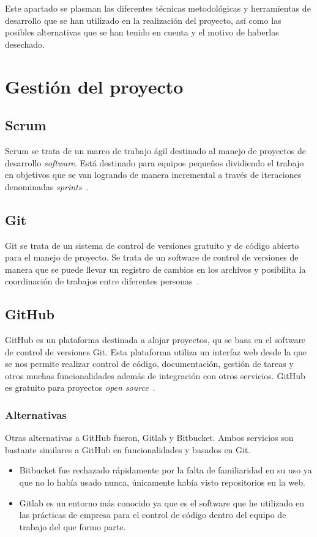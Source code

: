 
Este apartado se plasman las diferentes técnicas metodológicas y herramientas de desarrollo que se han utilizado en la realización del proyecto, así como las posibles alternativas que se han tenido en cuenta y el motivo de haberlas desechado.

\section{Gestión del proyecto}\label{GesProyecto}
\subsection{Scrum}\label{Scrum}
Scrum se trata de un marco de trabajo ágil destinado al manejo de proyectos de desarrollo \emph{software}. Está destinado para equipos pequeños dividiendo el trabajo en objetivos que se van logrando de manera incremental a través de iteraciones denominadas \emph{sprints}~\cite{wiki:scrm}.

\subsection{Git}\label{Git}
Git se trata de un sistema de control de versiones gratuito y de código abierto para el manejo de proyecto. Se trata de un software de control de versiones de manera que se puede llevar un registro de cambios en los archivos y posibilita la coordinación de trabajos entre diferentes personas~\cite{git_1,git_2}.

\subsection{GitHub}\label{GitHub}
GitHub es un plataforma destinada a alojar proyectos, qu se basa en el software de control de versiones Git. Esta plataforma utiliza un interfaz web desde la que se nos permite realizar control de código, documentación, gestión de tareas y otros muchas funcionalidades además de integración con otros servicios. GitHub es gratuito para proyectos \emph{open source}~\cite{wiki:github_wiki,github}.

\subsubsection{Alternativas}\label{AlternativasGitHub}
Otras alternativas a GitHub fueron, Gitlab y Bitbucket. Ambos servicios son bastante similares a GitHub en funcionalidades y basados en Git.
\begin{itemize}
	\item Bitbucket fue rechazado rápidamente por la falta de familiaridad en su uso ya que no lo había usado nunca, únicamente había visto repositorios en la web.
	
	\item Gitlab es un entorno más conocido ya que es el software que he utilizado en las prácticas de empresa para el control de código dentro del equipo de trabajo del que formo parte.
\end{itemize}


